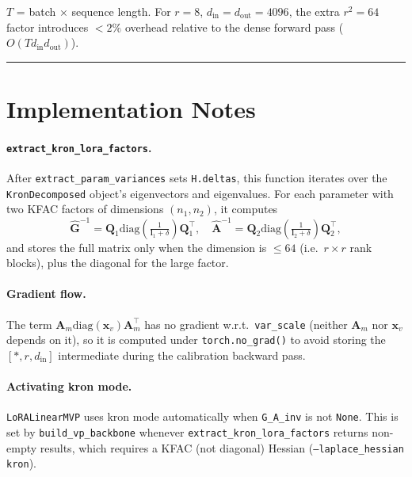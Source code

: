 \documentclass[11pt]{article}
\newcommand{\diag}{\mathrm{diag}}
\begin{document}
$T$ = batch $\times$ sequence length.  For $r{=}8$, $d_\text{in}{=}d_\text{out}{=}4096$,
the extra $r^2 = 64$ factor introduces $<2\%$ overhead relative to the dense
forward pass ($O(T d_\text{in} d_\text{out})$).

\bigskip\hrule\bigskip

\section{Implementation Notes}

\paragraph{\texttt{extract\_kron\_lora\_factors}.}
After \texttt{extract\_param\_variances} sets \texttt{H.deltas}, this function
iterates over the \texttt{KronDecomposed} object's eigenvectors and eigenvalues.
For each parameter with two KFAC factors of dimensions $(n_1, n_2)$, it computes
\begin{equation}
  \hat{\bm G}^{-1} = \bm Q_1 \diag\!\left(\tfrac{1}{\bm l_1 + \delta}\right)\bm Q_1^\top, \quad
  \hat{\bm A}^{-1} = \bm Q_2 \diag\!\left(\tfrac{1}{\bm l_2 + \delta}\right)\bm Q_2^\top,
\end{equation}
and stores the full matrix only when the dimension is $\leq 64$
(i.e.\ $r \times r$ rank blocks), plus the diagonal for the large factor.

\paragraph{Gradient flow.}
The term $\bm A_m\diag(\bm x_v)\bm A_m^\top$ has no gradient w.r.t.\
\texttt{var\_scale} (neither $\bm A_m$ nor $\bm x_v$ depends on it), so it is
computed under \texttt{torch.no\_grad()} to avoid storing the $[*,r,d_\text{in}]$
intermediate during the calibration backward pass.

\paragraph{Activating kron mode.}
\texttt{LoRALinearMVP} uses kron mode automatically when \texttt{G\_A\_inv}
is not \texttt{None}.  This is set by \texttt{build\_vp\_backbone} whenever
\texttt{extract\_kron\_lora\_factors} returns non-empty results, which requires
a KFAC (not diagonal) Hessian (\texttt{--laplace\_hessian kron}).
\end{document}

